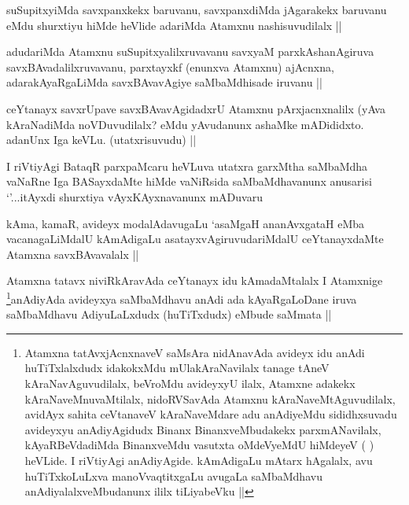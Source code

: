 \begin{artha}
suSupitxyiMda savxpanxkekx baruvanu, savxpanxdiMda jAgarakekx baruvanu eMdu shurxtiyu hiMde heVlide adariMda Atamxnu nashisuvudilalx ||
\end{artha}


\begin{artha}
adudariMda Atamxnu suSupitxyalilxruvavanu savxyaM parxkAshanAgiruva savxBAvadalilxruvavanu, parxtayxkf (enunxva Atamxnu) ajAcnxna, adarakAyaRgaLiMda savxBAvavAgiye saMbaMdhisade iruvanu ||
\end{artha}

\begin{artha}
ceYtanayx savxrUpave savxBAvavAgidadxrU Atamxnu pArxjacnxnalilx (yAva kAraNadiMda noVDuvudilalx? eMdu yAvudanunx ashaMke mADididxto. adanUnx Iga keVLu. (utatxrisuvudu) ||
\end{artha}

\begin{artha}
I riVtiyAgi BataqR parxpaMcaru heVLuva utatxra garxMtha saMbaMdha vaNaRne Iga BASayxdaMte hiMde vaNiRsida saMbaMdhavanunx anusarisi `\stext'...itAyxdi shurxtiya vAyxKAyxnavanunx mADuvaru
\end{artha}

\begin{artha}
kAma, kamaR, avideyx modalAdavugaLu `asaMgaH ananAvxgataH eMba vacanagaLiMdalU kAmAdigaLu asatayxvAgiruvudariMdalU ceYtanayxdaMte Atamxna savxBAvavalalx ||
\end{artha}

\begin{artha}
Atamxna tatavx niviRkAravAda ceYtanayx idu kAmadaMtalalx I Atamxnige \footnote{Atamxna tatAvxjAcnxnaveV saMsAra nidAnavAda avideyx idu anAdi huTiTxlalxdudx idakokxMdu mUlakAraNavilalx tanage tAneV kAraNavAguvudilalx, beVroMdu avideyxyU ilalx, Atamxne adakekx kAraNaveMnuvaMtilalx, nidoRVSavAda Atamxnu kAraNaveMtAguvudilalx, avidAyx sahita ceVtanaveV kAraNaveMdare adu anAdiyeMdu sididhxsuvadu avideyxyu anAdiyAgidudx Binanx BinanxveMbudakekx parxmANavilalx, kAyaRBeVdadiMda BinanxveMdu vasutxta oMdeVyeMdU hiMdeyeV ( ) heVLide. I riVtiyAgi anAdiyAgide. kAmAdigaLu mAtarx hAgalalx, avu huTiTxkoLuLxva manoVvaqtitxgaLu avugaLa saMbaMdhavu anAdiyalalxveMbudanunx ililx tiLiyabeVku ||}anAdiyAda avideyxya saMbaMdhavu anAdi ada kAyaRgaLoDane iruva saMbaMdhavu AdiyuLaLxdudx (huTiTxdudx) eMbude saMmata ||
\end{artha}

